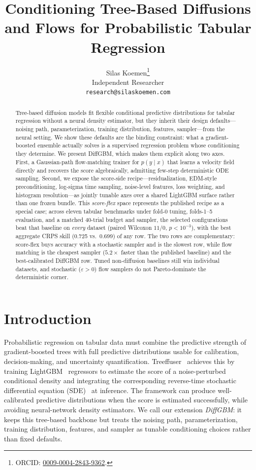 \documentclass{article}
\title{Conditioning Tree-Based Diffusions and Flows for Probabilistic Tabular Regression}
\author{%
  Silas Koemen\thanks{ORCID: \href{https://orcid.org/0009-0004-2843-9362}{0009-0004-2843-9362}.}\\
  Independent Researcher\\
  \texttt{research@silaskoemen.com}
}
\begin{document}
\maketitle

\begin{abstract}
Tree-based diffusion models fit flexible conditional predictive distributions for tabular regression without a neural density estimator, but they inherit their design defaults---noising path, parameterization, training distribution, features, sampler---from the neural setting. We show these defaults are the binding constraint: what a gradient-boosted ensemble actually solves is a supervised regression problem whose conditioning they determine. We present DiffGBM, which makes them explicit along two axes. First, a Gaussian-path flow-matching trainer for $p(y \mid x)$ that learns a velocity field directly and recovers the score algebraically, admitting few-step deterministic ODE sampling. Second, we expose the score-side recipe---residualization, EDM-style preconditioning, log-sigma time sampling, noise-level features, loss weighting, and histogram resolution---as jointly tunable axes over a shared LightGBM surface rather than one frozen bundle. This \emph{score-flex} space represents the published recipe as a special case; across eleven tabular benchmarks under fold-0 tuning, folds-1--5 evaluation, and a matched 40-trial budget and sampler, the selected configurations beat that baseline on \emph{every} dataset (paired Wilcoxon $11/0$, $p<10^{-3}$), with the best aggregate CRPS skill (0.725 vs.\ 0.699) of any row. The two rows are complementary: score-flex buys accuracy with a stochastic sampler and is the slowest row, while flow matching is the cheapest sampler ($5.2\times$ faster than the published baseline) and the best-calibrated DiffGBM row. Tuned non-diffusion baselines still win individual datasets, and stochastic ($\varepsilon>0$) flow samplers do not Pareto-dominate the deterministic corner.
\end{abstract}

\section{Introduction}\label{sec:intro}
Probabilistic regression on tabular data must combine the predictive strength of gradient-boosted trees with full predictive distributions usable for calibration, decision-making, and uncertainty quantification. Treeffuser~\citep{treeffuser} achieves this by training LightGBM~\citep{ke2017lightgbm} regressors to estimate the score of a noise-perturbed conditional density and integrating the corresponding reverse-time stochastic differential equation (SDE)~\citep{song2021score} at inference. The framework can produce well-calibrated predictive distributions when the score is estimated successfully, while avoiding neural-network density estimators. We call our extension \emph{DiffGBM}: it keeps this tree-based backbone but treats the noising path, parameterization, training distribution, features, and sampler as tunable conditioning choices rather than fixed defaults.
\end{document}
